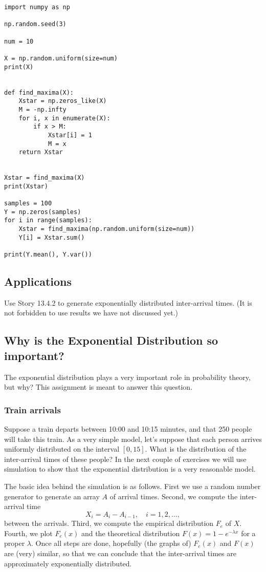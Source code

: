 \documentclass[assignments]{subfiles}
\begin{document}
\begin{verbatim}
import numpy as np

np.random.seed(3)

num = 10

X = np.random.uniform(size=num)
print(X)


def find_maxima(X):
    Xstar = np.zeros_like(X)
    M = -np.infty
    for i, x in enumerate(X):
        if x > M:
            Xstar[i] = 1
            M = x
    return Xstar


Xstar = find_maxima(X)
print(Xstar)

samples = 100
Y = np.zeros(samples)
for i in range(samples):
    Xstar = find_maxima(np.random.uniform(size=num))
    Y[i] = Xstar.sum()

print(Y.mean(), Y.var())
\end{verbatim}



\subsection{Applications}
\label{sec:applications}

Use Story 13.4.2 to generate exponentially distributed inter-arrival times. (It is not forbidden to use results we have not discussed yet.)


\subsection{Why is the Exponential Distribution so important?}
\label{sec:org50b29b7}

The exponential distribution plays a very important role in probability theory, but why? This assignment is meant to answer this question.  

\subsubsection{Train arrivals}
\label{sec:org25e266e}

Suppose a train departs between 10:00 and 10:15 minutes, and that 250 people will take this train.
As a very simple model, let's suppose that each person arrives uniformly distributed on the interval \([0,15]\).
What is the distribution of the inter-arrival times of these people?
In the next couple of exercises we will use simulation to show that the exponential distribution is a very reasonable model.

The basic idea behind the simulation is as follows. First we use a random number generator to generate an array \(A\) of arrival times. Second, we compute the inter-arrival time
\begin{equation}
\label{eq:1}
X_{i} = A_{i} - A_{i-1},\quad i = 1,2, \ldots,
\end{equation}
between the arrivals.
Third, we compute the empirical distribution \(F_{e}\) of \(X\).
Fourth, we plot  \(F_{e}(x)\) and  the theoretical distribution \(F(x) = 1-e^{-\lambda x}\) for a proper \(\lambda\). 
Once all steps are done, hopefully (the graphs of) \(F_{e}(x)\) and \(F(x)\) are (very) similar, so that we can conclude that the inter-arrival times are approximately exponentially distributed. 
\end{document}
